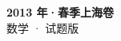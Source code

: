 \documentclass[zihao=-4, a4paper]{ctexart}
\begin{document}
\begin{center}
  {\Large\bfseries 2013 年·春季上海卷}\\[4pt]
  {\large 数学 · 试题版}
\end{center}
\medskip
{}

\end{document}
